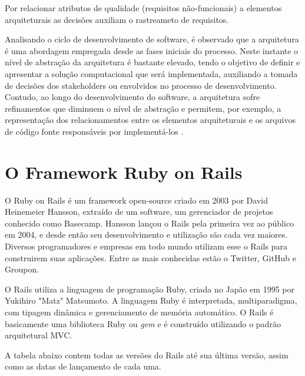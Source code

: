 Por relacionar atributos de qualidade (requisitos não-funcionais) a elementos arquiteturais as decisões auxiliam o rastreameto de requisitos.



Analisando o ciclo de desenvolvimento de software, é observado que a arquitetura é uma abordagem empregada desde as fases iniciais do processo. Neste instante o nível de abstração da arquitetura é bastante elevado, tendo o objetivo de definir e apresentar a solução computacional que será implementada, auxiliando a tomada de decisões dos stakeholders ou envolvidos no processo de desenvolvimento. Contudo, ao longo do desenvolvimento do software, a arquitetura sofre refinamentos que diminuem o nível de abstração e permitem, por exemplo, a representação dos relacionamentos entre os elementos arquiteturais e os arquivos de código fonte responsáveis por implementá-los \cite{clements2002documenting}.




\section{O Framework Ruby on Rails}

O Ruby on Rails é um framework open-source criado em 2003 por David Heinemeier Hansson, extraído de um software, um gerenciador de projetos conhecido como Basecamp.
Hansson lançou o Rails pela primeira vez ao público em 2004, e desde então seu desenvolvimento e utilização são cada vez maiores. Diversos programadores e empresas em todo mundo utilizam esse o Rails para construirem suas aplicações. Entre as mais conhecidas estão o Twitter, GitHub e Groupon. 

O Rails utiliza a linguagem de programação Ruby, criada no Japão em 1995 por Yukihiro "Matz" Matsumoto. A linguagem Ruby é interpretada, multiparadigma, com tipagem dinâmica e gerenciamento de memória automático. O Rails é basicamente uma biblioteca Ruby ou \textit{gem} e é construído utilizando o padrão arquitetural MVC.

A tabela abaixo contem todas as versões do Rails até sua última versão, assim como as datas de lançamento de cada uma.

